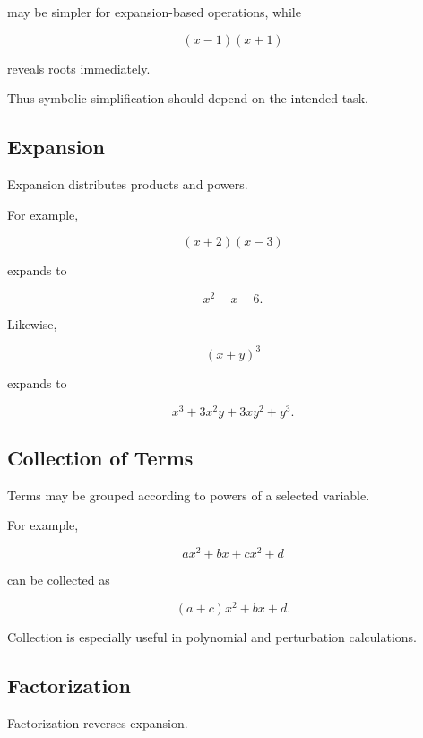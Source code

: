may be simpler for expansion-based operations, while

\[
\boxed{
(x-1)(x+1)
}
\]

reveals roots immediately.

Thus symbolic simplification should depend on the intended task.

\subsection{Expansion}
\label{subsec:symbolic-expansion}

Expansion distributes products and powers.

For example,

\[
(x+2)(x-3)
\]

expands to

\[
\boxed{
x^2-x-6.
}
\]

Likewise,

\[
(x+y)^3
\]

expands to

\[
\boxed{
x^3
+
3x^2y
+
3xy^2
+
y^3.
}
\]

\subsection{Collection of Terms}
\label{subsec:collecting-symbolic-terms}

Terms may be grouped according to powers of a selected variable.

For example,

\[
ax^2+bx+cx^2+d
\]

can be collected as

\[
\boxed{
(a+c)x^2+bx+d.
}
\]

Collection is especially useful in polynomial and perturbation
calculations.

\subsection{Factorization}
\label{subsec:symbolic-factorization}

Factorization reverses expansion.

